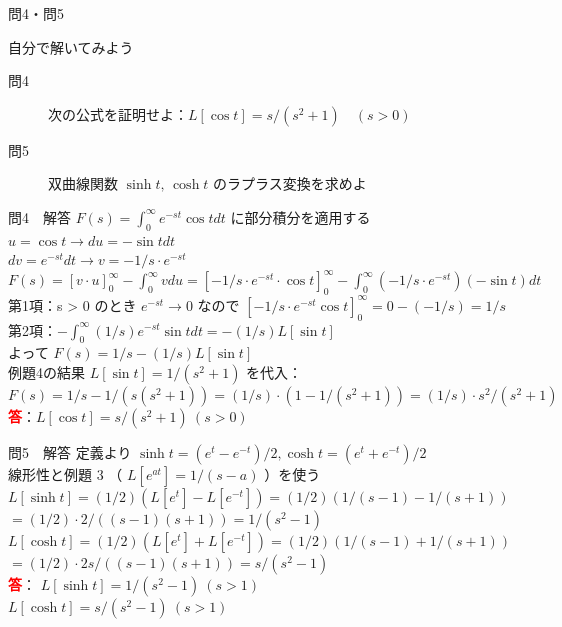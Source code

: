 \documentclass[professionalfonts]{beamer}
\begin{document}
\begin{frame}{問4・問5}
  \begin{exampleblock}{自分で解いてみよう}
  \begin{description}
    \item[問4] 次の公式を証明せよ：$L[\cos t] = s/(s^2+1) \quad (s > 0)$
    \item[問5] 双曲線関数 $\sinh t,\, \cosh t$ のラプラス変換を求めよ
  \end{description}
  \end{exampleblock}
\end{frame}

\begin{frame}{問4　解答}
  $F(s) = \int_{0}^\infty e^{-st} \cos t dt$ に部分積分を適用する\\[4pt]
  $u = \cos t  \to  du = -\sin t dt$\\[4pt]
  $dv = e^{-st} dt  \to  v = -1/s \cdot e^{-st}$\\[4pt]
  $F(s) = [v\cdot u]_{0}^\infty - \int_{0}^\infty v du = [-1/s \cdot e^{-st} \cdot \cos t]_{0}^\infty - \int_{0}^\infty (-1/s \cdot e^{-st})(-\sin t) dt$\\[4pt]
  第1項：s > 0 のとき $e^{-st} \to 0$ なので $[-1/s \cdot e^{-st} \cos t]_{0}^\infty = 0 - (-1/s) = 1/s$\\[4pt]
  第2項：$-\int_{0}^\infty (1/s) e^{-st} \sin t dt = -(1/s) L[\sin t]$\\[4pt]
  よって $F(s) = 1/s - (1/s) L[\sin t]$\\[4pt]
  例題4の結果 $L[\sin t] = 1/(s^{2}+1)$ を代入：\\[4pt]
  $F(s) = 1/s - 1/(s(s^{2}+1)) = (1/s)\cdot(1 - 1/(s^{2}+1)) = (1/s)\cdot s^{2}/(s^{2}+1)$
  \\[8pt]\textcolor{red}{\textbf{答}}：$L[\cos t] = s/(s^{2}+1) \ (s > 0)$
\end{frame}

\begin{frame}{問5　解答}
  定義より $\sinh t = (e^t - e^{-t})/2, \cosh t = (e^t + e^{-t})/2$\\[4pt]
  線形性と例題 3 （ $L[e^{at}] = 1/(s-a)$ ）を使う\\[4pt]
  $L[\sinh t] = (1/2)(L[e^t] - L[e^{-t}]) = (1/2)(1/(s-1) - 1/(s+1))$\\[4pt]
  $        = (1/2)\cdot2/((s-1)(s+1)) = 1/(s^{2}-1)$\\[4pt]
  $L[\cosh t] = (1/2)(L[e^t] + L[e^{-t}]) = (1/2)(1/(s-1) + 1/(s+1))$\\[4pt]
  $        = (1/2)\cdot2s/((s-1)(s+1)) = s/(s^{2}-1)$
  \\[8pt]\textcolor{red}{\textbf{答}}：
  $L[\sinh t] = 1/(s^{2}-1) \ (s > 1)$\\
  $L[\cosh t] = s/(s^{2}-1) \ (s > 1)$\\
\end{frame}
\end{document}

